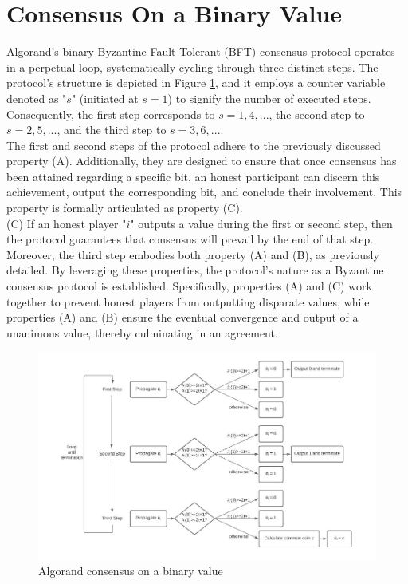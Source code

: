 \section{Consensus On a Binary Value}
Algorand's binary Byzantine Fault Tolerant (BFT) consensus protocol operates in a perpetual loop, systematically cycling through three distinct steps. The protocol's structure is depicted in Figure \ref{fig:L16_f4}, and it employs a counter variable denoted as "$s$" (initiated at $s = 1$) to signify the number of executed steps. Consequently, the first step corresponds to $s = 1, 4, ...$, the second step to $s = 2, 5, ...$, and the third step to $s = 3, 6, ...$.\\
The first and second steps of the protocol adhere to the previously discussed property (A). Additionally, they are designed to ensure that once consensus has been attained regarding a specific bit, an honest participant can discern this achievement, output the corresponding bit, and conclude their involvement. This property is formally articulated as property (C).\\
(C) If an honest player "$i$" outputs a value during the first or second step, then the protocol guarantees that consensus will prevail by the end of that step. Moreover, the third step embodies both property (A) and (B), as previously detailed. By leveraging these properties, the protocol's nature as a Byzantine consensus protocol is established. Specifically, properties (A) and (C) work together to prevent honest players from outputting disparate values, while properties (A) and (B) ensure the eventual convergence and output of a unanimous value, thereby culminating in an agreement.
\begin{center}
	\begin{figure}
		\centering
		\includegraphics[width=0.8\linewidth]{Fig/16/F4}
		\caption{Algorand consensus on a binary value}
		\label{fig:L16_f4}
	\end{figure}
\end{center}
